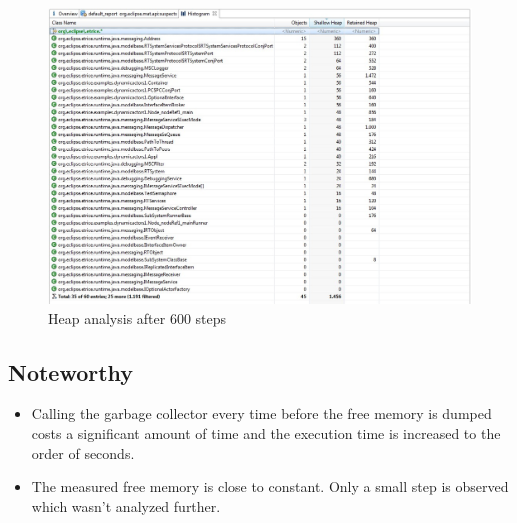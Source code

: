 \begin{figure}
\includegraphics[scale=0.45]{images/039-DynAct2-HeapAnalysis.jpg}
\caption{Heap analysis after 600 steps}
\label{fig:dynact2_heap}
\end{figure}

\subsection{Noteworthy}

\begin{itemize}
\item Calling the garbage collector every time before the free memory is dumped
costs a significant amount of time and the execution time is increased to the order of seconds.
\item The measured free memory is close to constant. Only a small step is observed which wasn't analyzed further.
\end{itemize}
